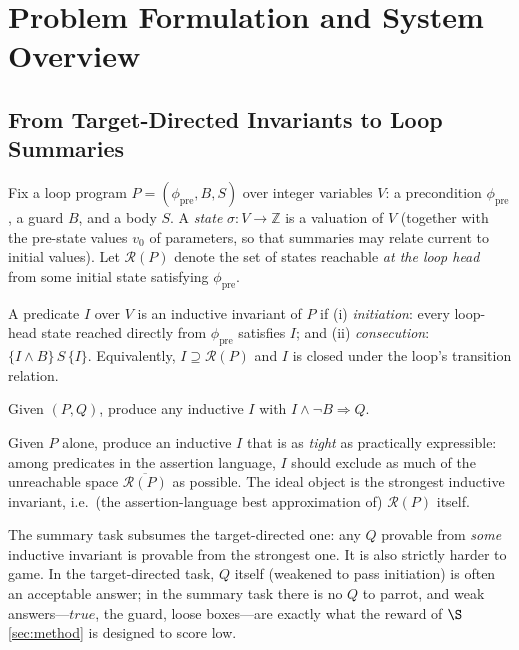 \section{Problem Formulation and System Overview}\label{sec:overview}

\subsection{From Target-Directed Invariants to Loop Summaries}
\label{sec:overview:task}

Fix a loop program $P = (\phi_{\mathrm{pre}}, B, S)$ over integer variables $V$: a precondition $\phi_{\mathrm{pre}}$, a guard $B$, and a body $S$.
A \emph{state} $\sigma : V \to \mathbb{Z}$ is a valuation of $V$ (together with the pre-state values $v_0$ of parameters, so that summaries may relate current to initial values).
Let $\mathcal{R}(P)$ denote the set of states reachable \emph{at the loop head} from some initial state satisfying $\phi_{\mathrm{pre}}$.

\begin{definition}
A predicate $I$ over $V$ is an inductive invariant of $P$ if
(i) \emph{initiation}: every loop-head state reached directly from $\phi_{\mathrm{pre}}$ satisfies $I$; and
(ii) \emph{consecution}: $\{I \wedge B\}\, S\, \{I\}$.
Equivalently, $I \supseteq \mathcal{R}(P)$ and $I$ is closed under the loop's transition relation.
\end{definition}

\begin{definition}
Given $(P, Q)$, produce any inductive $I$ with $I \wedge \neg B \Rightarrow Q$.
\end{definition}

\begin{definition}
Given $P$ alone, produce an inductive $I$ that is as \emph{tight} as practically expressible: among predicates in the assertion language, $I$ should exclude as much of the unreachable space $\overline{\mathcal{R}(P)}$ as possible.
The ideal object is the strongest inductive invariant, i.e.\ (the assertion-language best approximation of) $\mathcal{R}(P)$ itself.
\end{definition}

The summary task subsumes the target-directed one: any $Q$ provable from \emph{some} inductive invariant is provable from the strongest one.
It is also strictly harder to game.
In the target-directed task, $Q$ itself (weakened to pass initiation) is often an acceptable answer; in the summary task there is no $Q$ to parrot, and weak answers---$\mathit{true}$, the guard, loose boxes---are exactly what the reward of $\S$\ref{sec:method} is designed to score low.

